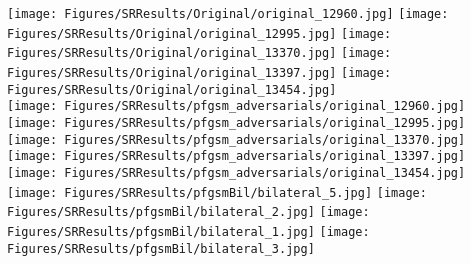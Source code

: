 \documentclass[sn-mathphys]{sn-jnl}%
\theoremstyle{thmstyleone}%
\theoremstyle{thmstyletwo}%
\theoremstyle{thmstylethree}%
\begin{document}
\begin{figure*}
\centering     %
\texttt{[image: Figures/SRResults/Original/original\_12960.jpg]}
\texttt{[image: Figures/SRResults/Original/original\_12995.jpg]}
\texttt{[image: Figures/SRResults/Original/original\_13370.jpg]}
\texttt{[image: Figures/SRResults/Original/original\_13397.jpg]}
\texttt{[image: Figures/SRResults/Original/original\_13454.jpg]}\\
\texttt{[image: Figures/SRResults/pfgsm\_adversarials/original\_12960.jpg]}
\texttt{[image: Figures/SRResults/pfgsm\_adversarials/original\_12995.jpg]}
\texttt{[image: Figures/SRResults/pfgsm\_adversarials/original\_13370.jpg]}
\texttt{[image: Figures/SRResults/pfgsm\_adversarials/original\_13397.jpg]}
\texttt{[image: Figures/SRResults/pfgsm\_adversarials/original\_13454.jpg]}\\
\texttt{[image: Figures/SRResults/pfgsmBil/bilateral\_5.jpg]}
\texttt{[image: Figures/SRResults/pfgsmBil/bilateral\_2.jpg]}
\texttt{[image: Figures/SRResults/pfgsmBil/bilateral\_1.jpg]}
\texttt{[image: Figures/SRResults/pfgsmBil/bilateral\_3.jpg]}

\end{figure*}
\end{document}
